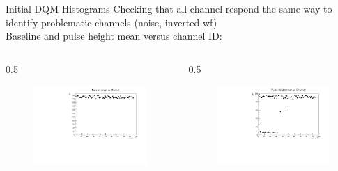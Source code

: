 \documentclass{beamer}[10pt]
\begin{document}
\begin{frame}{Initial DQM Histograms}
Checking that all channel respond the same way to identify problematic channels (noise, inverted wf) 
\\
Baseline and pulse height mean versus channel ID:
  \begin{columns}
\begin{column}{0.5\framewidth}
\begin{figure}[H]
   \centering
   \includegraphics[width= .90\columnwidth]{figures/pdf/bl_vs_ch.pdf}
   \label{fig:wffytl}
 \end{figure}
\end{column}
 \begin{column}{0.5\framewidth}
  \begin{figure}[H]
   \centering
   \includegraphics[width= .90\columnwidth]{figures/pdf/ph_vs_ch.pdf}
   \label{fig:wffytl}
 \end{figure}
\end{column}
\end{columns}
\end{frame}
\end{document}
